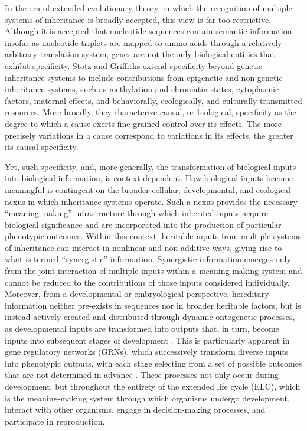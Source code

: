\documentclass[pdflatex,sn-mathphys-num]{sn-jnl}
\theoremstyle{thmstylethree}
\theoremstyle{thmstyleone}
\begin{document}
In the era of extended evolutionary theory, in which the recognition of multiple systems of inheritance is broadly accepted, this view is far too restrictive. Although it is accepted that nucleotide sequences contain semantic information insofar as nucleotide triplets are mapped to amino acids through a relatively arbitrary translation system, genes are not the only biological entities that exhibit specificity. Stotz and Griffiths \cite{griffiths2017genetic} extend specificity beyond genetic inheritance systems to include contributions from epigenetic and non-genetic inheritance systems, such as methylation and chromatin states, cytoplasmic factors, maternal effects, and behaviorally, ecologically, and culturally transmitted resources. More broadly, they characterize causal, or biological, specificity as the degree to which a cause exerts fine-grained control over its effects. The more precisely variations in a cause correspond to variations in its effects, the greater its causal specificity. 

Yet, such specificity, and, more generally, the transformation of biological inputs into biological information, is context-dependent. How biological inputs become meaningful is contingent on the broader cellular, developmental, and ecological nexus in which inheritance systems operate. Such a nexus provides the necessary “meaning-making” infrastructure through which inherited inputs acquire biological significance and are incorporated into the production of particular phenotypic outcomes. Within this context, heritable inputs from multiple systems of inheritance can interact in nonlinear and non-additive ways, giving rise to what is termed “synergistic” information. Synergistic information emerges only from the joint interaction of multiple inputs within a meaning-making system and cannot be reduced to the contributions of those inputs considered individually. Moreover, from a developmental or embryological perspective, hereditary information neither pre-exists in sequences nor in broader heritable factors, but is instead actively created and distributed through dynamic ontogenetic processes, as developmental inputs are transformed into outputs that, in turn, become inputs into subsequent stages of development \cite{keller2009rethinking}. This is particularly apparent in gene regulatory networks (GRNs), which successively transform diverse inputs into phenotypic outputs, with each stage selecting from a set of possible outcomes that are not determined in advance \cite{calcott2014creation}. These processes not only occur during development, but throughout the entirety of the extended life cycle (ELC), which is the meaning-making system through which organisms undergo development, interact with other organisms, engage in decision-making processes, and participate in reproduction. 
 
\end{document}
